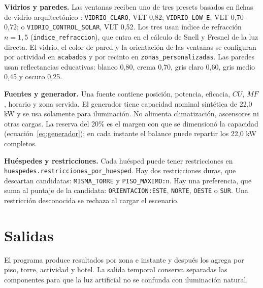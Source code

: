 \documentclass[12pt,a4paper]{article}
\newcommand{\clase}[1]{\texttt{#1}}
\newcommand{\codigo}[1]{\texttt{#1}}
\begin{document}
\textbf{Vidrios y paredes.} Las ventanas reciben uno de tres presets basados en fichas de vidrio arquitectónico \cite{cardinalSolarControl,cardinalClear}: \clase{VIDRIO\_CLARO}, VLT 0,82; \clase{VIDRIO\_LOW\_E}, VLT 0,70--0,72; o \clase{VIDRIO\_CONTROL\_SOLAR}, VLT 0,52. Los tres usan índice de refracción $n=1,5$ (\codigo{indice\_refraccion}), que entra en el cálculo de Snell y Fresnel de la luz directa. El vidrio, el color de pared y la orientación de las ventanas se configuran por actividad en \codigo{acabados} y por recinto en \codigo{zonas\_personalizadas}. Las paredes usan reflectancias educativas: blanco 0,80, crema 0,70, gris claro 0,60, gris medio 0,45 y oscuro 0,25.

\textbf{Fuentes y generador.} Una fuente contiene posición, potencia, eficacia, $CU$, $MF$, horario y zona servida. El generador tiene capacidad nominal sintética de 22,0 kW y se usa solamente para iluminación. No alimenta climatización, ascensores ni otras cargas. La reserva del 20\% es el margen con que se dimensionó la capacidad (ecuación~\ref{eq:generador}); en cada instante el balance puede repartir los 22,0 kW completos.

\textbf{Huéspedes y restricciones.} Cada huésped puede tener restricciones en \codigo{huespedes.restricciones\_por\_huesped}. Hay dos restricciones duras, que descartan candidatas: \codigo{MISMA\_TORRE} y \codigo{PISO\_MAXIMO:n}. Hay una preferencia, que suma al puntaje de la candidata: \codigo{ORIENTACION:ESTE}, \codigo{NORTE}, \codigo{OESTE} o \codigo{SUR}. Una restricción desconocida se rechaza al cargar el escenario.

\section{Salidas}

El programa produce resultados por zona e instante y después los agrega por piso, torre, actividad y hotel. La salida temporal conserva separadas las componentes para que la luz artificial no se confunda con iluminación natural.
\end{document}
